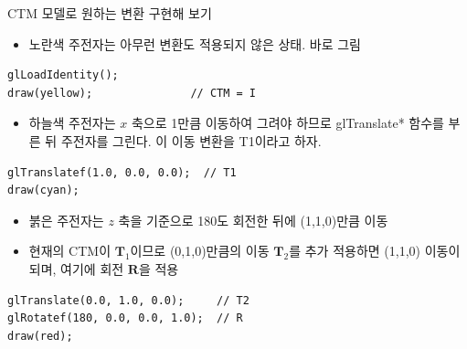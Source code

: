 \documentclass{beamer}
\begin{document}
\begin{frame}[fragile]{CTM 모델로 원하는 변환 구현해 보기}

{\small
\begin{itemize}
\item 노란색 주전자는 아무런 변환도 적용되지 않은 상태. 바로 그림
\end{itemize}
\lstset{language=C++, escapechar=^} 
\begin{lstlisting}
glLoadIdentity();
draw(yellow);				// CTM = I 
\end{lstlisting}

\begin{itemize}
\item 하늘색 주전자는 $x$ 축으로 1만큼 이동하여 그려야 하므로 {\sf glTranslate*} 함수를 부른 뒤 주전자를 그린다. 이 이동 변환을 T1이라고 하자.
\end{itemize}
\lstset{language=C++, escapechar=^} 
\begin{lstlisting}
glTranslatef(1.0, 0.0, 0.0);  // T1
draw(cyan);
\end{lstlisting}

\begin{itemize}
\item 붉은 주전자는 $z$ 축을 기준으로 180도 회전한 뒤에 (1,1,0)만큼 이동
\item 현재의 CTM이 ${\mathbf T}_1$이므로 (0,1,0)만큼의 이동 ${\mathbf T}_2$를 추가 적용하면 (1,1,0) 이동이 되며, 여기에 회전 ${\mathbf R}$을 적용
\end{itemize}
\lstset{language=C++, escapechar=^} 
\begin{lstlisting}
glTranslate(0.0, 1.0, 0.0);		// T2
glRotatef(180, 0.0, 0.0, 1.0);	// R
draw(red);
\end{lstlisting}
}
\end{frame}
\end{document}
